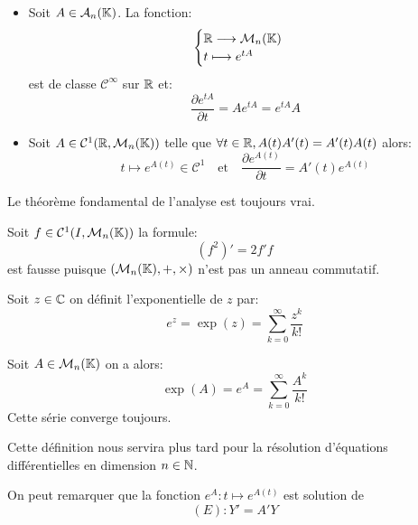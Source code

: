 \begin{prop} 
		\begin{itemize} 
			\item Soit $A \in \mathcal{A}_n(\mathbb{K})$. La fonction:
			\[ 
				\begin{cases} 
					\mathbb{R} \longrightarrow \mathcal{M}_n(\mathbb{K}) \\ 
					t \longmapsto e^{tA} 
				\end{cases}
			\]
			est de classe $ \mathcal{C}^\infty$ sur $\mathbb{R}$ et: 
					\[ \boxed{ \frac{\partial e^{tA}}{\partial t} = A e^{tA} = e^{tA} A } \]
			\item Soit $A \in \mathcal{C}^1(\mathbb{R}, \mathcal{M}_n(\mathbb{K}))$ telle que 
			$ \forall t \in \mathbb{R}, A(t)A'(t) = A'(t) A(t)$  alors: 
				\[ t \longmapsto e^{A(t)} \in \mathcal{C}^1 \quad \text{et} \quad \frac{\partial e^{A(t)}}{\partial t} = A'(t)e^{A(t)} \]
		\end{itemize}
		Le théorème fondamental de l'analyse est toujours vrai. 
\end{prop}

\begin{remark} 
	Soit $f \in \mathcal{C}^1(I,\mathcal{M}_n(\mathbb{K}))$ la formule:
		\[ (f^2)' = 2f'f \] 
	est fausse puisque $( \mathcal{M}_n(\mathbb{K}), +, \times)$ n'est pas un anneau commutatif. 
\end{remark} 

\begin{definition}[Exponentielle] 
	Soit $z \in \mathbb{C}$ on définit l'exponentielle de $z$ par: 
		\[ e^z = \exp (z) = \sum_{k=0}^{\infty} \frac{z^k}{k!} \]
\end{definition} 

\begin{definition}
	Soit $A \in \mathcal{M}_n(\mathbb{K})$ on a alors: 
		\[ \exp(A) = e^A = \sum_{k=0}^{\infty} \frac{A^k}{k!} \] 
	Cette série converge toujours. 
\end{definition} 

\begin{remark} 
	Cette définition nous servira plus tard pour la résolution d'équations 
	différentielles en dimension $n \in \mathbb{N}$. 

	On peut remarquer que la fonction $e^A : t \longmapsto e^{A(t)} $ est solution de 
		\[ (E) : Y' = A'Y \]
\end{remark} 


